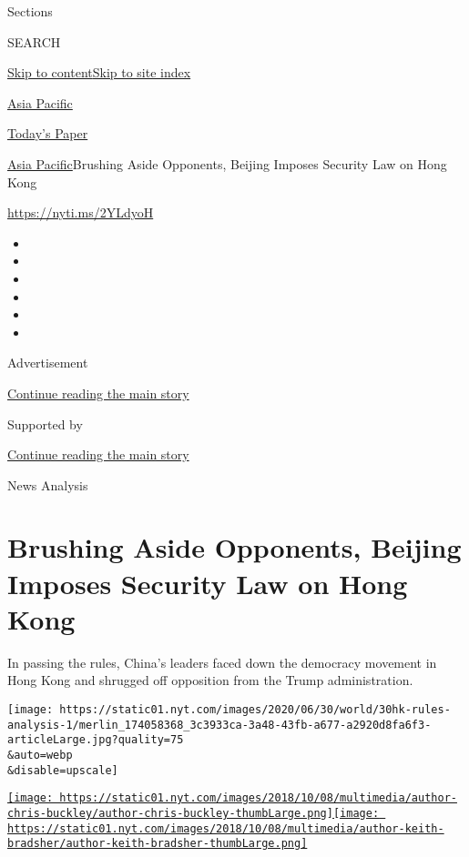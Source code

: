 Sections

SEARCH

\protect\hyperlink{site-content}{Skip to
content}\protect\hyperlink{site-index}{Skip to site index}

\href{https://www.nytimes.com/section/world/asia}{Asia Pacific}

\href{https://myaccount.nytimes.com/auth/login?response_type=cookie\&client_id=vi}{}

\href{https://www.nytimes.com/section/todayspaper}{Today's Paper}

\href{/section/world/asia}{Asia Pacific}\textbar{}Brushing Aside
Opponents, Beijing Imposes Security Law on Hong Kong

\url{https://nyti.ms/2YLdyoH}

\begin{itemize}
\item
\item
\item
\item
\item
\item
\end{itemize}

Advertisement

\protect\hyperlink{after-top}{Continue reading the main story}

Supported by

\protect\hyperlink{after-sponsor}{Continue reading the main story}

News Analysis

\hypertarget{brushing-aside-opponents-beijing-imposes-security-law-on-hong-kong}{%
\section{Brushing Aside Opponents, Beijing Imposes Security Law on Hong
Kong}\label{brushing-aside-opponents-beijing-imposes-security-law-on-hong-kong}}

In passing the rules, China's leaders faced down the democracy movement
in Hong Kong and shrugged off opposition from the Trump administration.

\texttt{[image: https://static01.nyt.com/images/2020/06/30/world/30hk-rules-analysis-1/merlin\_174058368\_3c3933ca-3a48-43fb-a677-a2920d8fa6f3-articleLarge.jpg?quality=75\\\&auto=webp\\\&disable=upscale]}

\href{https://www.nytimes.com/by/chris-buckley}{\texttt{[image: https://static01.nyt.com/images/2018/10/08/multimedia/author-chris-buckley/author-chris-buckley-thumbLarge.png]}}\href{https://www.nytimes.com/by/keith-bradsher}{\texttt{[image: https://static01.nyt.com/images/2018/10/08/multimedia/author-keith-bradsher/author-keith-bradsher-thumbLarge.png]}}

